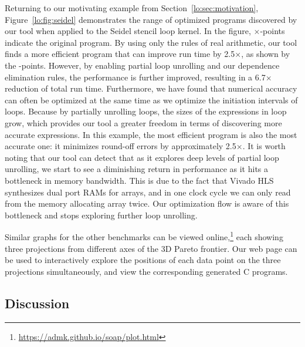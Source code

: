 Returning to our motivating example from Section~\ref{lo:sec:motivation},
Figure~\ref{lo:fig:seidel} demonstrates the range of optimized programs
discovered by our tool when applied to the Seidel stencil loop kernel. In
the figure, $\times$-points indicate the original program. By using only the
rules of real arithmetic, our tool finds a more efficient program that can
improve run time by 2.5$\times$, as shown by the \redcircle-points. However,
by enabling partial loop unrolling and our dependence elimination rules, the
performance is further improved, resulting in a 6.7$\times$ reduction of
total run time.  Furthermore, we have found that numerical accuracy can often
be optimized at the same time as we optimize the initiation intervals of
loops. Because by partially unrolling loops, the sizes of the expressions in
loop grow, which provides our tool a greater freedom in terms of discovering
more accurate expressions. In this example, the most efficient program is
also the most accurate one: it minimizes round-off errors by approximately
2.5$\times$. It is worth noting that our tool can detect that as it explores
deep levels of partial loop unrolling, we start to see a diminishing return
in performance as it hits a bottleneck in memory bandwidth.  This is due to
the fact that Vivado HLS synthesizes dual port RAMs for arrays, and in one
clock cycle we can only read from the memory allocating array twice.  Our
optimization flow is aware of this bottleneck and stops exploring further loop
unrolling.

Similar graphs for the other benchmarks can be viewed
online,\footnote{\url{https://admk.github.io/soap/plot.html}} each showing
three projections from different axes of the 3D Pareto frontier. Our web page
can be used to interactively explore the positions of each data point on the
three projections simultaneously, and view the corresponding generated C
programs.

\subsection{Discussion}
\label{lo:sec:results_discussion}

